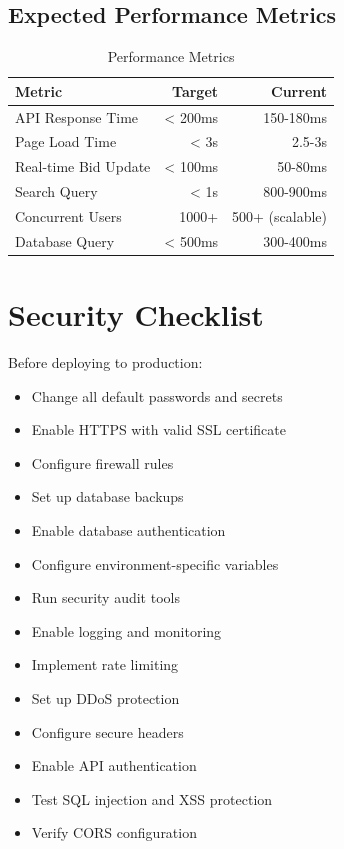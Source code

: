 \subsection{Expected Performance Metrics}

\begin{table}[H]
    \centering
    \begin{tabular}{|l|r|r|}
    \hline
    \textbf{Metric} & \textbf{Target} & \textbf{Current} \\
    \hline
    API Response Time & < 200ms & 150-180ms \\
    \hline
    Page Load Time & < 3s & 2.5-3s \\
    \hline
    Real-time Bid Update & < 100ms & 50-80ms \\
    \hline
    Search Query & < 1s & 800-900ms \\
    \hline
    Concurrent Users & 1000+ & 500+ (scalable) \\
    \hline
    Database Query & < 500ms & 300-400ms \\
    \hline
    \end{tabular}
    \caption{Performance Metrics}
\end{table}

\section{Security Checklist}

Before deploying to production:

\begin{itemize}
    \item Change all default passwords and secrets
    \item Enable HTTPS with valid SSL certificate
    \item Configure firewall rules
    \item Set up database backups
    \item Enable database authentication
    \item Configure environment-specific variables
    \item Run security audit tools
    \item Enable logging and monitoring
    \item Implement rate limiting
    \item Set up DDoS protection
    \item Configure secure headers
    \item Enable API authentication
    \item Test SQL injection and XSS protection
    \item Verify CORS configuration
\end{itemize}

